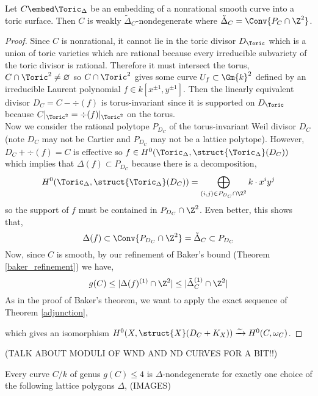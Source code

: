 \documentclass[12pt]{article}
\begin{document}
\begin{prop}
Let $C \embed \Toric_\Delta$ be an embedding of a nonrational smooth curve into a toric surface. Then $C$ is weakly $\tilde{\Delta}_C$-nondegenerate where $\tilde{\Delta}_C = \Conv{P_C \cap \Z^2}$. 
\end{prop}

\begin{proof}
Since $C$ is nonrational, it cannot lie in the toric divisor $D_\Toric$ which is a union of toric varieties which are rational because every irreducible subvariety of the toric divisor is rational. Therefore it must intersect the torus, $C \cap \Toric^2 \neq \varnothing$ so $C \cap \Toric^2$ gives some curve $U_f \subset \Gm{k}^2$ defined by an irreducible Laurent polynomial $f \in k[x^{\pm 1}, y^{\pm 1}]$. Then the linearly equivalent divisor $D_C = C - \div{(f)}$ is torus-invariant since it is supported on $D_\Toric$ because $C |_{\Toric^2} = \div{(f)} |_{\Toric^2}$ on the torus. 
\bigskip\\
Now we consider the rational polytope $P_{D_C}$ of the torus-invariant Weil divisor $D_C$ (note $D_C$ may not be Cartier and $P_{D_C}$ may not be a lattice polytope). However, $D_C + \div{(f)} = C$ is effective so $f \in H^0(\Toric_\Delta, \struct{\Toric_\Delta}(D_C))$ which implies that $\Delta(f) \subset P_{D_C}$ because there is a decomposition,
\[ H^0(\Toric_\Delta, \struct{\Toric_\Delta}(D_C)) = \bigoplus_{(i,j) \in P_{D_C} \cap \Z^2} k \cdot x^i y^j \]
so the support of $f$ must be contained in $P_{D_C} \cap \Z^2$. Even better, this shows that,
\[ \Delta(f) \subset \Conv{P_{D_C} \cap \Z^2} = \tilde{\Delta}_C \subset P_{D_C} \]
Now, since $C$ is smooth, by our refinement of Baker's bound (Theorem \ref{baker_refinement}) we have,
\[ g(C) \le |\Delta(f)^{(1)} \cap \Z^2| \le |\tilde{\Delta}_C^{(1)} \cap \Z^2 | \]
As in the proof of Baker's theorem, we want to apply the exact sequence of Theorem \ref{adjunction},
\begin{center}
\end{center}
which gives an isomorphism $H^0(X, \struct{X}(D_C + K_X)) \xrightarrow{\sim} H^0(C, \omega_C)$. 
\end{proof}


(TALK ABOUT MODULI OF WND AND ND CURVES FOR A BIT!!)

\begin{thm}[CW, ]
Every curve $C / k$ of genus $g(C) \le 4$ is $\Delta$-nondegenerate for exactly one choice of the following lattice polygons $\Delta$,
(IMAGES)
\end{thm}
\end{document}
